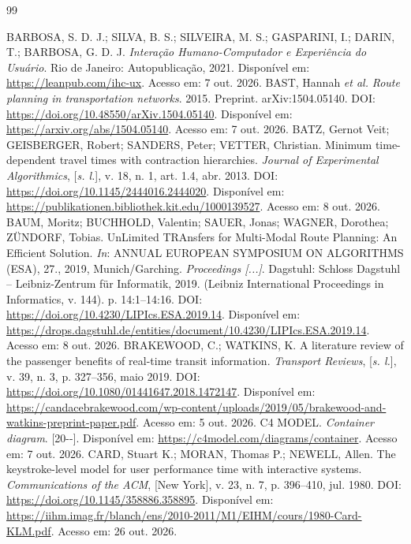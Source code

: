 \documentclass[12pt,oneside,a4paper,brazil,chapter=TITLE]{abntex2}
\begin{document}
\postextual
\begin{thebibliography}{99}
\SingleSpacing\raggedright
\setlength{\bibsep}{\baselineskip}
 BARBOSA, S. D. J.; SILVA, B. S.; SILVEIRA, M. S.; GASPARINI, I.; DARIN, T.; BARBOSA, G. D. J. \textit{Interação Humano-Computador e Experiência do Usuário}. Rio de Janeiro: Autopublicação, 2021. Disponível em: \url{https://leanpub.com/ihc-ux}. Acesso em: 7 out. 2026.
 BAST, Hannah \textit{et al.} \textit{Route planning in transportation networks}. 2015. Preprint. arXiv:1504.05140. DOI: \url{https://doi.org/10.48550/arXiv.1504.05140}. Disponível em: \url{https://arxiv.org/abs/1504.05140}. Acesso em: 7 out. 2026.
 BATZ, Gernot Veit; GEISBERGER, Robert; SANDERS, Peter; VETTER, Christian. Minimum time-dependent travel times with contraction hierarchies. \textit{Journal of Experimental Algorithmics}, [\textit{s. l.}], v. 18, n. 1, art. 1.4, abr. 2013. DOI: \url{https://doi.org/10.1145/2444016.2444020}. Disponível em: \url{https://publikationen.bibliothek.kit.edu/1000139527}. Acesso em: 8 out. 2026.
 BAUM, Moritz; BUCHHOLD, Valentin; SAUER, Jonas; WAGNER, Dorothea; ZÜNDORF, Tobias. UnLimited TRAnsfers for Multi-Modal Route Planning: An Efficient Solution. \textit{In}: ANNUAL EUROPEAN SYMPOSIUM ON ALGORITHMS (ESA), 27., 2019, Munich/Garching. \textit{Proceedings [...]}. Dagstuhl: Schloss Dagstuhl -- Leibniz-Zentrum für Informatik, 2019. (Leibniz International Proceedings in Informatics, v. 144). p. 14:1--14:16. DOI: \url{https://doi.org/10.4230/LIPIcs.ESA.2019.14}. Disponível em: \url{https://drops.dagstuhl.de/entities/document/10.4230/LIPIcs.ESA.2019.14}. Acesso em: 8 out. 2026.
 BRAKEWOOD, C.; WATKINS, K. A literature review of the passenger benefits of real-time transit information. \textit{Transport Reviews}, [\textit{s. l.}], v. 39, n. 3, p. 327--356, maio 2019. DOI: \url{https://doi.org/10.1080/01441647.2018.1472147}. Disponível em: \url{https://candacebrakewood.com/wp-content/uploads/2019/05/brakewood-and-watkins-preprint-paper.pdf}. Acesso em: 5 out. 2026.
 C4 MODEL. \textit{Container diagram}. [20\mbox{-}\mbox{-}]. Disponível em: \url{https://c4model.com/diagrams/container}. Acesso em: 7 out. 2026.
 CARD, Stuart K.; MORAN, Thomas P.; NEWELL, Allen. The keystroke-level model for user performance time with interactive systems. \textit{Communications of the ACM}, [New York], v. 23, n. 7, p. 396--410, jul. 1980. DOI: \url{https://doi.org/10.1145/358886.358895}. Disponível em: \url{https://iihm.imag.fr/blanch/ens/2010-2011/M1/EIHM/cours/1980-Card-KLM.pdf}. Acesso em: 26 out. 2026.

\end{thebibliography}
\end{document}

